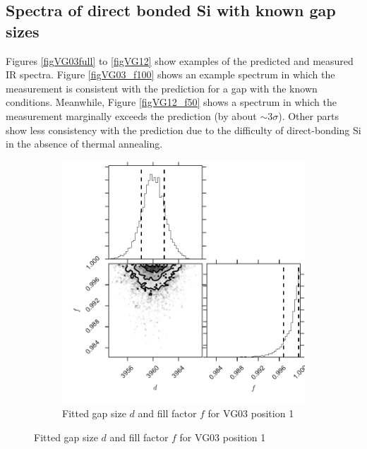 \documentclass[osajnl,preprint,showpacs,superscriptaddress,12pt]{revtex4-1} %
\begin{document}
\subsection{Spectra of direct bonded Si with known gap sizes}
\label{secKnownGaps}
Figures \ref{figVG03full} to \ref{figVG12} show examples of the predicted and measured IR spectra.  Figure \ref{figVG03_f100} shows an example spectrum in which the measurement is consistent with the prediction for a gap with the known conditions.  Meanwhile, Figure \ref{figVG12_f50} shows a spectrum in which the measurement marginally exceeds the prediction (by about $\sim 3 \sigma$).  Other parts show less consistency with the prediction due to the difficulty of direct-bonding Si in the absence of thermal annealing.  

\begin{figure}[htbp]
        \centering
        \begin{subfigure}[b]{0.5\textwidth}
              \includegraphics[width=\textwidth]{figs/VG03_corner.pdf}
              \caption{Fitted gap size $d$ and fill factor $f$ for VG03 position 1}
		\label{figVG03_corner}
        \end{subfigure}
	

\end{figure}
\end{document}
